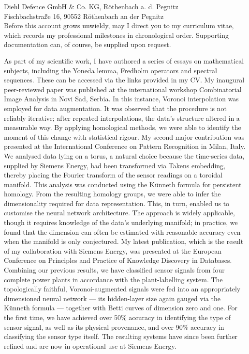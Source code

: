 \documentclass[11pt]{letter}
\begin{document}
\begin{letter}{%
Diehl Defence GmbH & Co. KG, Röthenbach a. d. Pegnitz\\%
Fischbachstraße 16, 90552 Röthenbach an der Pegnitz\\%
}
Before this account grows unwieldy, may I direct you to my curriculum vitae, which records my professional milestones in chronological order. Supporting documentation can, of course, be supplied upon request.

As part of my scientific work, I have authored a series of essays on mathematical subjects, including the Yoneda lemma, Fredholm operators and spectral sequences. These can be accessed via the links provided in my CV. My inaugural peer-reviewed paper was published at the international workshop Combinatorial Image Analysis in Novi Sad, Serbia. In this instance, Voronoi interpolation was employed for data augmentation. It was observed that the procedure is not reliably iterative; after repeated interpolations, the data's structure altered in a measurable way. By applying homological methods, we were able to identify the moment of this change with statistical rigour. My second major contribution was presented at the International Conference on Pattern Recognition in Milan, Italy. We analysed data lying on a torus, a natural choice because the time-series data, supplied by Siemens Energy, had been transformed via Takens embedding, thereby placing the Fourier transform of the sensor readings on a toroidal manifold. This analysis was conducted using the Künneth formula for persistent homology. From the resulting homology groups, we were able to infer the dimensionality required for data representation. This, in turn, enabled us to customise the neural network architecture. The approach is widely applicable, though it requires knowledge of the data's underlying manifold; in practice, we found that the dimension can often be estimated with reasonable accuracy even when the manifold is only conjectured. My latest publication, which is the result of my collaboration with Siemens Energy, was presented at the European Conference on Principles and Practice of Knowledge Discovery in Databases. Combining our previous results, we have classified sensor signals from four complete power plants in accordance with the plant-labelling system. The topologically faithful, Voronoi-augmented signals were fed into an appropriately dimensioned neural network — its hidden-layer size again gauged via the Künneth formula — together with Betti curves of dimension zero and one. For the first time, we have achieved over 50\% accuracy in identifying the type of sensor signal, as well as its physical provenance, and over 90\% accuracy in classifying the sensor type itself. The resulting systems have since been further refined and are now in operational use at Siemens Energy.


\end{letter}
\end{document}
